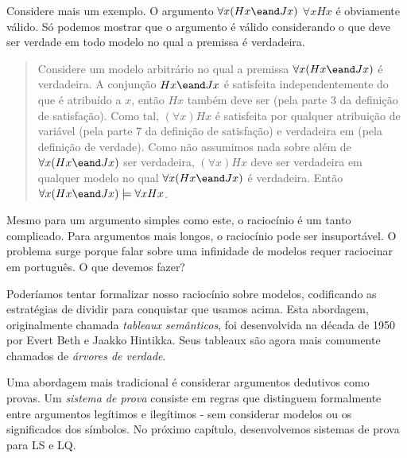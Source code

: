 Considere mais um exemplo. O argumento $\forall x(Hx \eand Jx)$ \therefore  $\forall x Hx$ é obviamente válido. Só podemos mostrar que o argumento é válido considerando o que deve ser verdade em todo modelo no qual a premissa é verdadeira.
\begin{quote}
Considere um modelo arbitrário  no qual a premissa $\forall x(Hx \eand Jx)$ é verdadeira. A conjunção $Hx \eand Jx$ é satisfeita independentemente do que é atribuído a $x$, então $Hx$ também deve ser (pela parte 3 da definição de {satisfação}). Como tal, $(\forall x) Hx$ é satisfeita por qualquer atribuição de variável (pela parte 7 da definição de {satisfação}) e verdadeira em  (pela definição de {verdade}).
Como não assumimos nada sobre  além de $\forall x(Hx \eand Jx)$ ser verdadeira, $(\forall x) Hx$ deve ser verdadeira em qualquer modelo no qual $\forall x(Hx \eand Jx)$ é verdadeira. Então $\forall x(Hx \eand Jx) \models \forall x Hx$.
\end{quote}
Mesmo para um argumento simples como este, o raciocínio é um tanto complicado. Para argumentos mais longos, o raciocínio pode ser insuportável. O problema surge porque falar sobre uma infinidade de modelos requer raciocinar em português. O que devemos fazer?

Poderíamos tentar formalizar nosso raciocínio sobre modelos, codificando as estratégias de dividir para conquistar que usamos acima. Esta abordagem, originalmente chamada \emph{tableaux semânticos}, foi desenvolvida na década de 1950 por Evert Beth e Jaakko Hintikka. Seus tableaux são agora mais comumente chamados de \emph{árvores de verdade}.

Uma abordagem mais tradicional é considerar argumentos dedutivos como provas. Um \emph{sistema de prova} consiste em regras que distinguem formalmente entre argumentos legítimos e ilegítimos - sem considerar modelos ou os significados dos símbolos. No próximo capítulo, desenvolvemos sistemas de prova para LS e LQ.

\practiceproblems

